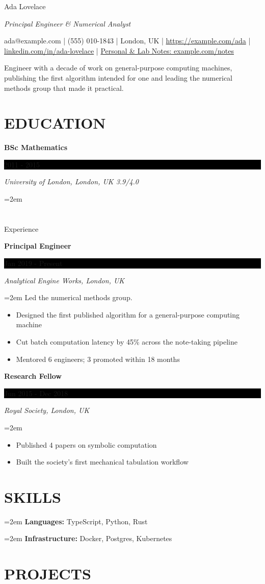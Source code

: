 \documentclass[fontsize=11pt]{article}
\newcommand{\sepspace}{\vspace*{1em}}   %
\newcommand{\MyName}[1]{ %
    \Huge \usefont{OT1}{phv}{b}{n} \hfill #1
    \par \normalsize \normalfont}
\newcommand{\MySlogan}[1]{ %
    \large \usefont{OT1}{phv}{m}{n}\hfill \textit{#1}
    \par \normalsize \normalfont}
\newcommand{\NewPart}[1]{\vspace{3pt}\section*{\uppercase{#1}}}
\newcommand{\SkillsEntry}[2]{
    \noindent\hangindent=2em\hangafter=0 %
    \textbf{#1} #2 \par}                 %
\newcommand{\EducationEntry}[4]{
    \noindent \textbf{#1} \hfill      %
    \colorbox{Black}{
      \parbox{8.5em}{
      \hfill\color{White}#2}} \par  %
    \noindent \textit{#3} \par        %
    \noindent\hangindent=2em\hangafter=0 \small #4 %
    \normalsize \par}
\newcommand{\WorkEntry}[4]{       %
    \noindent \textbf{#1} \hfill      %
    \colorbox{Black}{%
      \parbox{9em}{%
      \hfill\color{White}#2}} \par   %
        \noindent \textit{#3} \par        %
    \noindent\hangindent=2em\hangafter=0 \small #4 %
    \normalsize \par}
\begin{document}
    \MyName{Ada Lovelace}
      \MySlogan{Principal Engineer \& Numerical Analyst}
      \bigskip
      {\small \hfill ada@example.com | (555) 010-1843 | London, UK | \href{https://example.com/ada}{https://example.\allowbreak{}com/\allowbreak{}ada} | \href{https://linkedin.com/in/ada-lovelace}{linkedin.\allowbreak{}com/\allowbreak{}in/\allowbreak{}ada-\allowbreak{}lovelace} | \href{https://example.com/notes}{Personal \& Lab Notes: example.\allowbreak{}com/\allowbreak{}notes}}
      
\smallskip
{\small Engineer with a decade of work on general-purpose computing machines, publishing the first algorithm intended for one and leading the numerical methods group that made it practical.\par}
    \NewPart{Education}{}
    \EducationEntry
{BSc Mathematics}
{2011 - 2015}
{University of London, London, UK 3.9/4.0}

      \NewPart{Experience}{}

      \WorkEntry
            {Principal Engineer}
            {Jan 2019 - Present}
            {Analytical Engine Works, London, UK}
            {Led the numerical methods group.\par\begin{itemize} \itemsep 2pt
  \item Designed the first published algorithm for a general-purpose computing machine
  \item Cut batch computation latency by 45\% across the note-taking pipeline
  \item Mentored 6 engineers; 3 promoted within 18 months
\end{itemize}}
            \sepspace
      \WorkEntry
            {Research Fellow}
            {Jun 2015 - Dec 2018}
            {Royal Society, London, UK}
            {\begin{itemize} \itemsep 2pt
  \item Published 4 papers on symbolic computation
  \item Built the society's first mechanical tabulation workflow
\end{itemize}}
\NewPart{Skills}{}
\SkillsEntry{Languages:}{TypeScript, Python, Rust}
\SkillsEntry{Infrastructure:}{Docker, Postgres, Kubernetes}
      \NewPart{Projects}{}
\end{document}
